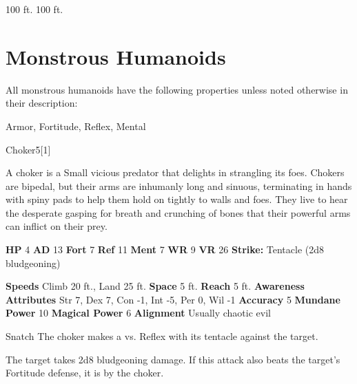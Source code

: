       
       100 ft.
     100 ft.
  
        \newpage
        \section{Monstrous Humanoids}

        All monstrous humanoids have the following properties unless noted otherwise in their description:
        
    
     Armor,
     Fortitude,
     Reflex,
     Mental
  
  
      
  \begin{monsection}{Choker}{5}[1]
    \vspace{-1em}\vspace{-1em}
    \vspace{0em}

    
        A choker is a Small vicious predator that delights in strangling its foes.
        Chokers are bipedal, but their arms are inhumanly long and sinuous, terminating in hands with spiny pads to help them hold on tightly to walls and foes.
        They live to hear the desperate gasping for breath and crunching of bones that their powerful arms can inflict on their prey.
      

    \begin{spellcontent}
      \begin{spelltargetinginfo}
        \pari \textbf{HP} 4 \monsep
          \textbf{AD} 13 \monsep
          \textbf{Fort} 7 \monsep
          \textbf{Ref} 11 \monsep
          \textbf{Ment} 7
        \pari \textbf{WR} 9 \monsep
        \textbf{VR} 26
        \pari \textbf{Strike:}
            Tentacle  (2d8 bludgeoning)
      \end{spelltargetinginfo}
    \end{spellcontent}
    \begin{monsterfooter}
      \pari \textbf{Speeds} Climb 20 ft., Land 25 ft. \monsep
        \textbf{Space} 5 ft. \monsep
        \textbf{Reach} 5 ft.
      \pari \textbf{Awareness} 
      \pari \textbf{Attributes}
        Str 7, Dex 7,
        Con -1, Int -5,
        Per 0, Wil -1
      \pari \textbf{Accuracy} 5 \monsep
        \textbf{Mundane Power} 10 \monsep
      \textbf{Magical Power} 6
      \pari \textbf{Alignment} Usually chaotic evil
    \end{monsterfooter}
  \end{monsection}
  \begin{freeability}{Snatch}
       The choker makes a 
         vs. Reflex
        with its tentacle against the target.
    
    \hit 
          The target takes 2d8 bludgeoning damage.
          If this attack also beats the target's Fortitude defense, it is  by the choker.
    \end{freeability}
  


